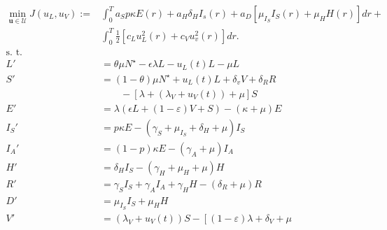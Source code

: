 \begin{equation}
    \label{eqn:vital_dynamics}
    \begin{aligned}
        \min_{\mathbf{u} \in \mathcal{U}}
            J(u_L, u_V) := &
                \int_0 ^  T
                    a_S p \kappa E(r) +
                    a_H \delta_H I_s(r) +
                    a_D
                    \left[
                        \mu_{I_S} I_S(r) + \mu_H H(r)
                    \right]
                dr +
        \\
                &
                \int_0^T
                    \frac{1}{2}
                    \left[
                        c_L u_L^2(r) +
                        c_V u_v^2(r)
                    \right]
                    dr.
        \\
            \text{s. t.} &
        \\
            L' & =  \theta \mu N^{\star}
                -\epsilon \lambda L - u_L(t) L - \mu L
        \\
            S' & =
                (1 - \theta) \mu N^\star
                + u_L(t) L
                + \delta_v V
                + \delta_R R
        \\
                & \qquad -
                \left[
                \lambda + (\lambda_V + u_V(t)) + \mu
                \right] S
        \\
            E' &=
                \lambda (\epsilon L + (1-\varepsilon) V + S)
                - (\kappa + \mu) E
        \\
            I_S' &=
                p \kappa E
                - (\gamma_S +
                    \mu_{I_S} +
                    \delta_H +
                    \mu) I_S
        \\
            I_A' &=
                (1 - p) \kappa E - (\gamma_A + \mu) I_A
        \\
            H' &=
                \delta_H I_S - (\gamma_H + \mu_H + \mu) H
        \\
            R'  &=
                \gamma_S I_S +
                \gamma_A I_A +
                \gamma_H H %
                - (\delta_R + \mu) R
        \\
            D' &=
                \mu_{I_S} I_S + \mu_H H
        \\
            V' &=
                (\lambda_V + u_V(t)) S
                - \left[
                (1 - \varepsilon) \lambda
                + \delta_V
                + \mu

\end{aligned}
\end{equation}
